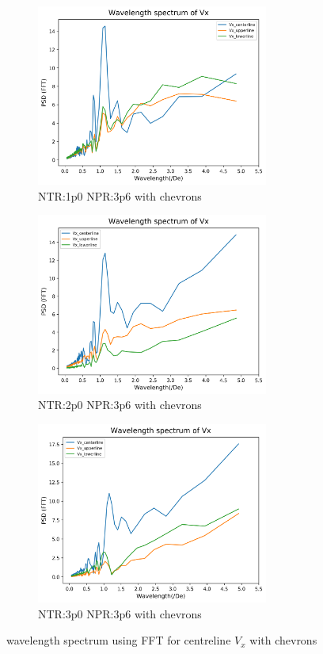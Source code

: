 \begin{figure}[H]
\begin{subfigure}{.5\textwidth}
	\centering
	\includegraphics[width=3in]{images/Fft_Vx_NTR1p0_NPR3p6c.png}
	\caption{NTR:1p0 NPR:3p6 with chevrons }
	\label{fig:setup1}
\end{subfigure}%
\begin{subfigure}{.5\textwidth}
	\centering
	\includegraphics[width=3in]{images/Fft_Vx_NTR2p0_NPR3p6c.png}
	\caption{NTR:2p0 NPR:3p6 with chevrons}
	\label{fig:setup2}
\end{subfigure}
\begin{subfigure}{1.0\textwidth}
	\centering
	\includegraphics[width=3in]{images/Fft_Vx_NTR3p0_NPR3p6c.png}
	\caption{NTR:3p0 NPR:3p6 with chevrons}
	\label{fig:setup1}
\end{subfigure}%
\caption{wavelength spectrum using FFT for centreline $V_x$ with  chevrons }
\label{fig:fftplotsc}
\end{figure}


